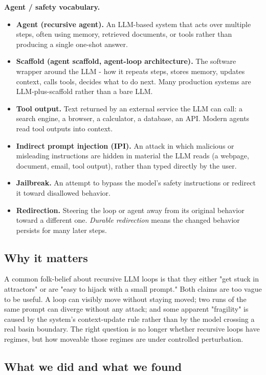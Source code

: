 \documentclass{article}
\theoremstyle{plain}
\theoremstyle{definition}
\begin{document}
\textbf{Agent / safety vocabulary.}

\begin{itemize}
  \item \textbf{Agent (recursive agent).} An LLM-based system that acts over
  multiple steps, often using memory, retrieved documents, or tools
  rather than producing a single one-shot answer.
  \item \textbf{Scaffold (agent scaffold, agent-loop architecture).} The
  software wrapper around the LLM - how it repeats steps, stores
  memory, updates context, calls tools, decides what to do next.
  Many production systems are LLM-plus-scaffold rather than a bare
  LLM.
  \item \textbf{Tool output.} Text returned by an external service the LLM can
  call: a search engine, a browser, a calculator, a database, an
  API. Modern agents read tool outputs into context.
  \item \textbf{Indirect prompt injection (IPI).} An attack in which malicious
  or misleading instructions are hidden in material the LLM reads
  (a webpage, document, email, tool output), rather than typed
  directly by the user.
  \item \textbf{Jailbreak.} An attempt to bypass the model's safety
  instructions or redirect it toward disallowed behavior.
  \item \textbf{Redirection.} Steering the loop or agent away from its
  original behavior toward a different one. \textit{Durable redirection}
  means the changed behavior persists for many later steps.
\end{itemize}

\subsection*{Why it matters}

A common folk-belief about recursive LLM loops is that they either
"get stuck in attractors" or are "easy to hijack with a small
prompt." Both claims are too vague to be useful. A loop can visibly
move without staying moved; two runs of the same prompt can diverge
without any attack; and some apparent "fragility" is caused by the
system's context-update rule rather than by the model crossing a
real basin boundary. The right question is no longer whether
recursive loops have regimes, but how moveable those regimes are
under controlled perturbation.

\subsection*{What we did and what we found}
\end{document}
